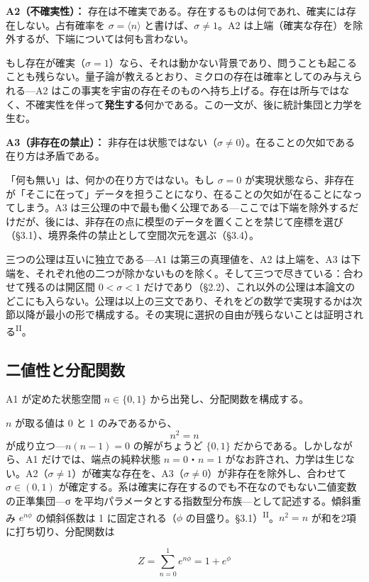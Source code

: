 \documentclass[fontsize=11pt,paper=a4,lualatex]{jlreq}
\newcommand{\PII}{\textsuperscript{\textup{II}}}
\begin{document}
\textbf{A2（不確実性）：} 存在は不確実である。存在するものは何であれ、確実には存在しない。占有確率を $\sigma = \langle n \rangle$ と書けば、$\sigma \neq 1$。A2 は上端（確実な存在）を除外するが、下端については何も言わない。

もし存在が確実（$\sigma = 1$）なら、それは動かない背景であり、問うことも起こることも残らない。量子論が教えるとおり、ミクロの存在は確率としてのみ与えられる---A2 はこの事実を宇宙の存在そのものへ持ち上げる。存在は所与ではなく、不確実性を伴って\textbf{発生する}何かである。この一文が、後に統計集団と力学を生む。

\textbf{A3（非存在の禁止）：} 非存在は状態ではない（$\sigma \neq 0$）。在ることの欠如である在り方は矛盾である。

「何も無い」は、何かの在り方ではない。もし $\sigma = 0$ が実現状態なら、非存在が「そこに在って」データを担うことになり、在ることの欠如が在ることになってしまう。A3 は三公理の中で最も働く公理である---ここでは下端を除外するだけだが、後には、非存在の点に模型のデータを置くことを禁じて座標を選び（§3.1）、境界条件の禁止として空間次元を選ぶ（§3.4）。

三つの公理は互いに独立である---A1 は第三の真理値を、A2 は上端を、A3 は下端を、それぞれ他の二つが除かないものを除く。そして三つで尽きている：合わせて残るのは開区間 $0 < \sigma < 1$ だけであり（§2.2）、これ以外の公理は本論文のどこにも入らない。公理は以上の三文であり、それをどの数学で実現するかは次節以降が最小の形で構成する。その実現に選択の自由が残らないことは証明される\PII{}。

\subsection{二値性と分配関数}\label{ux4e8cux5024ux6027}

A1 が定めた状態空間 $n \in \{0,1\}$ から出発し、分配関数を構成する。

$n$ が取る値は 0 と 1 のみであるから、
\[
  n^2 = n
\]
が成り立つ---$n(n{-}1) = 0$ の解がちょうど $\{0,1\}$ だからである。しかしながら、A1 だけでは、端点の純粋状態 $n = 0$・$n = 1$ がなお許され、力学は生じない。A2（$\sigma \neq 1$）が確実な存在を、A3（$\sigma \neq 0$）が非存在を除外し、合わせて $\sigma \in (0,1)$ が確定する。系は確実に存在するのでも不在なのでもない二値変数の正準集団---σ を平均パラメータとする指数型分布族---として記述する。傾斜重み $e^{n\phi}$ の傾斜係数は 1 に固定される（$\phi$ の目盛り。§3.1）\PII{}。$n^2 = n$ が和を2項に打ち切り、分配関数は

\[Z = \sum_{n=0}^{1} e^{n\phi} = 1 + e^{\phi}\]
\end{document}
